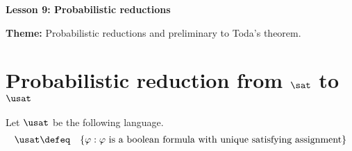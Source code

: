 \documentclass[11pt, a4paper]{article}
\renewcommand{\lesson}{9}
\renewcommand{\lessontitle}{Probabilistic reductions}
\renewcommand{\fulltitle}{Lesson \lesson: \lessontitle}
\begin{document}
\date{}



\begin{center}
{\Large {\bf \fulltitle}}
\end{center}
\vspace{0.5cm}

\noindent
{\bf Theme:} Probabilistic reductions and preliminary to Toda's theorem.



\section{Probabilistic reduction from $\sat$ to $\usat$}

Let $\usat$ be the following language.
\begin{eqnarray*}
\usat & \defeq & \{\varphi: \varphi\ \text{is a boolean formula with unique satisfying assignment}\}
\end{eqnarray*}
\end{document}
